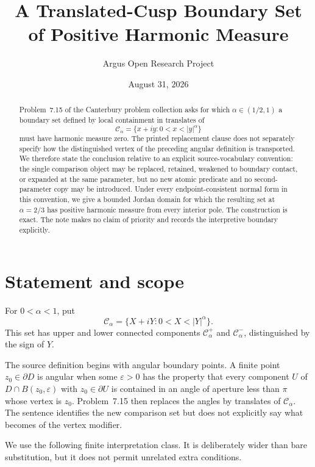 \documentclass[10pt,reqno]{amsart}
\title[Positive harmonic measure for a translated-cusp set]
{A Translated-Cusp Boundary Set\\of Positive Harmonic Measure}
\author{Argus Open Research Project}
\date{August 31, 2026}
\theoremstyle{definition}
\newcommand{\cC}{\mathcal C}
\begin{document}
\begin{abstract}
Problem~7.15 of the Canterbury problem collection asks for which
\(\alpha\in(1/2,1)\) a boundary set defined by local containment in
translates of
\[
 \cC_\alpha=\{x+iy:0<x<|y|^\alpha\}
\]
must have harmonic measure zero.  The printed replacement clause does not
separately specify how the distinguished vertex of the preceding angular
definition is transported.  We therefore state the conclusion relative to
an explicit source-vocabulary convention: the single comparison object may
be replaced, retained, weakened to boundary contact, or expanded at the same
parameter, but no new atomic predicate and no second-parameter copy may be
introduced.  Under every endpoint-consistent normal form in this convention,
we give a bounded Jordan domain for which the resulting set at
\(\alpha=2/3\) has positive harmonic measure from every interior pole.  The
construction is exact.  The note makes no claim of priority and records the
interpretive boundary explicitly.
\end{abstract}

\maketitle

\section{Statement and scope}

For \(0<\alpha<1\), put
\[
 \cC_\alpha=\{X+iY:0<X<|Y|^\alpha\}.
\]
This set has upper and lower connected components \(\cC_\alpha^+\) and
\(\cC_\alpha^-\), distinguished by the sign of \(Y\).

The source definition begins with angular boundary points.  A finite point
\(z_0\in\partial D\) is angular when some \(\varepsilon>0\) has the property
that every component \(U\) of \(D\cap B(z_0,\varepsilon)\) with
\(z_0\in\partial U\) is contained in an angle of aperture less than \(\pi\)
whose vertex is \(z_0\).  Problem~7.15 then replaces the angles by translates
of \(\cC_\alpha\).  The sentence identifies the new comparison set but does
not explicitly say what becomes of the vertex modifier.

We use the following finite interpretation class.  It is deliberately wider
than bare substitution, but it does not permit unrelated extra conditions.
\end{document}
